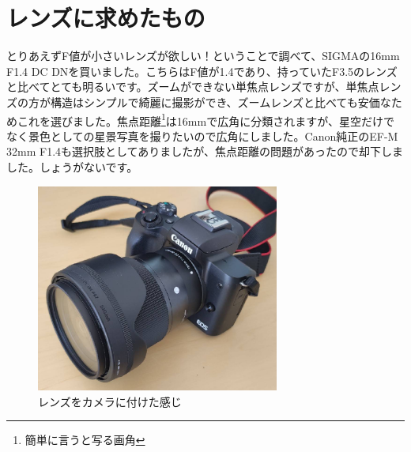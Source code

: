 \documentclass[a4paper.10pt]{jarticle}
\begin{document}
\section{レンズに求めたもの}
とりあえずF値が小さいレンズが欲しい！ということで調べて、SIGMAの16mm F1.4 DC DNを買いました。こちらはF値が1.4であり、持っていたF3.5のレンズと比べてとても明るいです。ズームができない単焦点レンズですが、単焦点レンズの方が構造はシンプルで綺麗に撮影ができ、ズームレンズと比べても安価なためこれを選びました。焦点距離\footnote{簡単に言うと写る画角}は16mmで広角に分類されますが、星空だけでなく景色としての星景写真を撮りたいので広角にしました。Canon純正のEF-M 32mm F1.4も選択肢としてありましたが、焦点距離の問題があったので却下しました。しょうがないです。
\begin{figure}
\begin{center}
  \includegraphics[width=8cm]{don.jpg}
\caption{レンズをカメラに付けた感じ}
\label{}
\end{center}
\end{figure}
\end{document}

